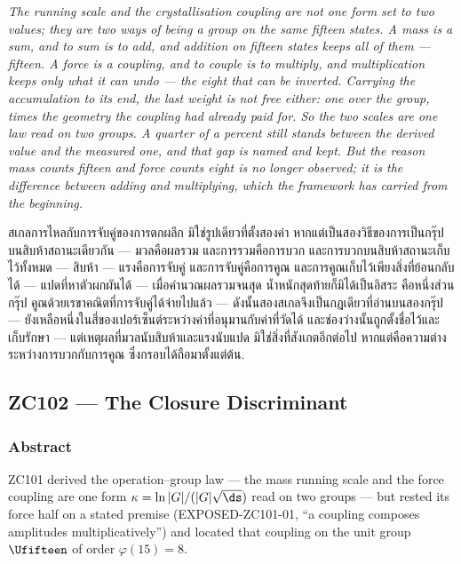 \documentclass[12pt, a4paper]{article}
\begin{document}
\bigskip
\begin{center}
\textit{%
The running scale and the crystallisation coupling are not one form set to two
values; they are two ways of being a group on the same fifteen states. A mass is
a sum, and to sum is to add, and addition on fifteen states keeps all of them ---
fifteen. A force is a coupling, and to couple is to multiply, and multiplication
keeps only what it can undo --- the eight that can be inverted. Carrying the
accumulation to its end, the last weight is not free either: one over the group,
times the geometry the coupling had already paid for. So the two scales are one
law read on two groups. A quarter of a percent still stands between the derived
value and the measured one, and that gap is named and kept. But the reason mass
counts fifteen and force counts eight is no longer observed; it is the difference
between adding and multiplying, which the framework has carried from the
beginning.}

\medskip
{\thaifont
สเกลการไหลกับการจับคู่ของการตกผลึก มิใช่รูปเดียวที่ตั้งสองค่า หากแต่เป็นสองวิธีของการเป็นกรุ๊ปบนสิบห้าสถานะเดียวกัน ---
มวลคือผลรวม และการรวมคือการบวก และการบวกบนสิบห้าสถานะเก็บไว้ทั้งหมด --- สิบห้า ---
แรงคือการจับคู่ และการจับคู่คือการคูณ และการคูณเก็บไว้เพียงสิ่งที่ย้อนกลับได้ --- แปดที่หาตัวผกผันได้ ---
เมื่อคำนวณผลรวมจนสุด น้ำหนักสุดท้ายก็มิได้เป็นอิสระ คือหนึ่งส่วนกรุ๊ป คูณด้วยเรขาคณิตที่การจับคู่ได้จ่ายไปแล้ว ---
ดังนั้นสองสเกลจึงเป็นกฎเดียวที่อ่านบนสองกรุ๊ป ---
ยังเหลือหนึ่งในสี่ของเปอร์เซ็นต์ระหว่างค่าที่อนุมานกับค่าที่วัดได้ และช่องว่างนั้นถูกตั้งชื่อไว้และเก็บรักษา ---
แต่เหตุผลที่มวลนับสิบห้าและแรงนับแปด มิใช่สิ่งที่สังเกตอีกต่อไป หากแต่คือความต่างระหว่างการบวกกับการคูณ ซึ่งกรอบได้ถือมาตั้งแต่ต้น.}
\end{center}



\subsection{ZC102 --- The Closure Discriminant}
\subsubsection*{Abstract}
\sloppy
ZC101 derived the operation--group law --- the mass running scale and the force
coupling are one form $\kappa=\ln|G|/(|G|\sqrt{\ds})$ read on two groups --- but
rested its force half on a stated premise (EXPOSED-ZC101-01, ``a coupling
composes amplitudes multiplicatively'') and located that coupling on the unit
group $\Ufifteen$ of order $\varphi(15)=8$.
\end{document}
